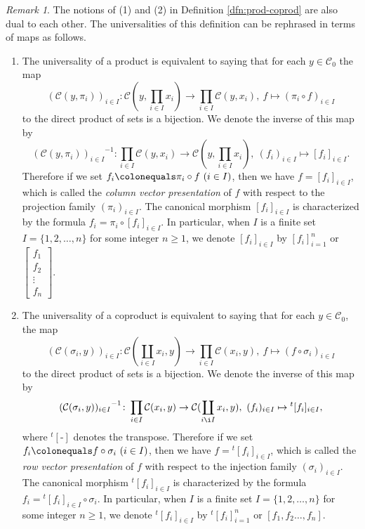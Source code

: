 \documentclass{surv-l}
\numberwithin{equation}{chapter}
\numberwithin{figure}{chapter}
\theoremstyle{plain}
\theoremstyle{definition}
\theoremstyle{remark}
\newtheorem{rmk}[thm]{Remark}
\begin{document}
\begin{rmk}\label{rmk:prod-coprod-bij}
The notions of (1) and (2) in Definition \ref{dfn:prod-coprod} are also dual to each other.
The universalities of this definition can be rephrased in terms of maps as follows.
\begin{enumerate}
\item
The universality of a product is equivalent to saying that
for each $y \in {\mathcal{C}}_0$ the map
\begin{equation}\label{eq:cvec-pres}
({\mathcal{C}}(y, \pi_i))_{i\in I} \colon {\mathcal{C}}(y, \prod_{i\in I}x_i) \to \prod_{i\in I}{\mathcal{C}}(y, x_i)
,\ f \mapsto (\pi_i\circ f)_{i\in I}
\end{equation}
to the direct product of sets is a bijection.
We denote the inverse of this map by
\[
{({\mathcal{C}}(y, \pi_i))_{i\in I}}^{-1} \colon \prod_{i\in I}{\mathcal{C}}(y, x_i) \to {\mathcal{C}}(y, \prod_{i\in I}x_i)
,\ (f_i)_{i\in I} \mapsto [f_i]_{i\in I}.
\]
Therefore if we set $f_i\colonequals  \pi_i \circ f \ (i \in I)$, then we have
$f = [f_i]_{i\in I}$,
which is called the \emph{column vector presentation} of $f$ with respect to the
projection family $(\pi_i)_{i\in I}$.
The canonical morphism $[f_i]_{i\in I}$ is characterized by the formula
$f_i = \pi_i \circ [f_i]_{i\in I}$.
In particular, when
$I$ is a finite set $I = \{1,2,\dots, n\}$ for some integer $n \ge 1$, we denote
$[f_i]_{i\in I}$ by $[f_i]_{i=1}^n$ or $\left[\begin{smallmatrix} f_1\\f_2\\\vdots\\f_n \end{smallmatrix} \right]$.

\item
The universality of a coproduct is equivalent to saying that
for each $y \in {\mathcal{C}}_0$, the map
\begin{equation}\label{eq:rvec-pres}
({\mathcal{C}}(\sigma_i, y))_{i\in I} \colon {\mathcal{C}}(\coprod_{i\in I}x_i, y) \to \prod_{i\in I}{\mathcal{C}}(x_i, y)
,\ f \mapsto (f\circ \sigma_i)_{i\in I}
\end{equation}
to the direct product of sets is a bijection.
We denote the inverse of this map by
\[
{({\mathcal{C}}(\sigma_i, y))_{i\in I}}^{-1} \colon \prod_{i\in I}{\mathcal{C}}(x_i, y) \to {\mathcal{C}}(\coprod_{i\i I}x_i, y)
,\ (f_i)_{i\in I} \mapsto {}^t[f_i]_{i\in I},
\]
where ${}^t[\text{-}]$ denotes the transpose.
Therefore if we set $f_i\colonequals  f \circ \sigma_i \ (i \in I)$, then we have $f = {}^t[f_i]_{i\in I}$,
which is called the \emph{row vector presentation} of $f$ with respect to
the injection family $(\sigma_i)_{i\in I}$.
The canonical morphism ${}^t[ f_i]_{i\in I}$ is characterized by the formula
$f_i = {}^t[f_i]_{i\in I}\circ \sigma_i$.
In particular, when $I$ is a finite set
$I = \{1,2,\dots, n\}$ for some integer $n \ge 1$, we denote
${}^t[f_i]_{i\in I}$ by ${}^t[f_i]_{i=1}^n$ or $[f_1, f_2\dots, f_n]$.
\end{enumerate}


\end{rmk}
\end{document}
